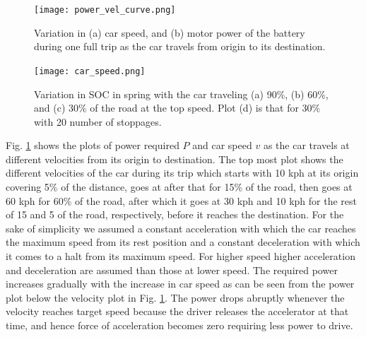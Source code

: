 \documentclass[journal]{IEEEtran/IEEEtran}
\newcommand{\figref}[1]{Fig. \ref{#1}}
\begin{document}
	
	\begin{figure}[!tb]
		\centering
		\texttt{[image: power\_vel\_curve.png]}
		\caption{Variation in (a) car speed, and (b) motor power of the battery during one full trip as the car travels from origin to its destination.}
		\label{fig:powercurve}
	\end{figure}
	\begin{figure}[!tb]
		\centering
		\texttt{[image: car\_speed.png]}
		\caption{Variation in SOC in spring with the car traveling (a) 90\%, (b) 60\%, and (c) 30\% of the road at the top speed. Plot (d) is that for 30\% with 20 number of stoppages.}
		\label{fig:car_speed}
	\end{figure}
	\figref{fig:powercurve} shows the plots of power required $P$ and car speed $v$ as the car travels at different velocities from its origin to destination. The top most plot shows the different velocities of the car during its trip which starts with 10 kph at its origin covering 5\% of the distance, goes at after that for 15\% of the road, then goes at 60 kph for 60\% of the road, after which it goes at 30 kph and 10 kph for the rest of 15 and 5 of the road, respectively, before it reaches the destination. For the sake of simplicity we assumed a constant acceleration with which the car reaches the maximum speed from its rest position and a constant deceleration with which it comes to a halt from its maximum speed. For higher speed higher acceleration and deceleration are assumed than those at lower speed. The required power increases gradually with the increase in car speed as can be seen from the power plot below the velocity plot in \figref{fig:powercurve}. The power drops abruptly whenever the velocity reaches target speed because the driver releases the accelerator at that time, and hence force of acceleration becomes zero requiring less power to drive.
\end{document}
